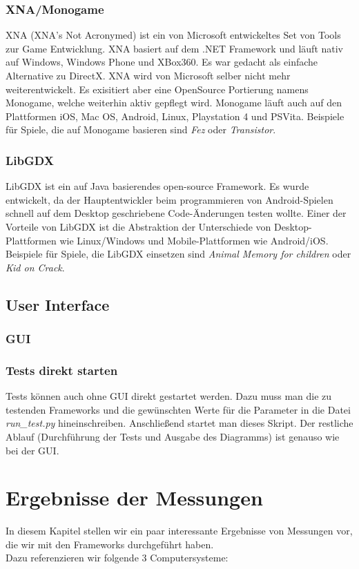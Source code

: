 \subsection{XNA/Monogame}
XNA (XNA's Not Acronymed) ist ein von Microsoft entwickeltes Set von Tools zur Game Entwicklung. XNA basiert auf dem .NET Framework und läuft nativ auf Windows, Windows Phone und XBox360. Es war gedacht als einfache Alternative zu DirectX. XNA wird von Microsoft selber nicht mehr weiterentwickelt. Es exisitiert aber eine OpenSource Portierung namens Monogame, welche weiterhin aktiv gepflegt wird. Monogame läuft auch auf den Plattformen iOS, Mac OS, Android, Linux, Playstation 4 und PSVita. Beispiele für Spiele, die auf Monogame basieren sind \emph{Fez} oder \emph{Transistor}.

\subsection{LibGDX}
LibGDX ist ein auf Java basierendes open-source Framework. Es wurde entwickelt, da der Hauptentwickler beim programmieren von Android-Spielen schnell auf dem Desktop geschriebene Code-Änderungen testen wollte. Einer der Vorteile von LibGDX ist die Abstraktion der Unterschiede von Desktop-Plattformen wie Linux/Windows und Mobile-Plattformen wie Android/iOS. Beispiele für Spiele, die LibGDX einsetzen sind \emph{Animal Memory for children} oder \emph{Kid on Crack}.

\section{User Interface}
\subsection{GUI}
\subsection{Tests direkt starten}
Tests können auch ohne GUI direkt gestartet werden. Dazu muss man die zu testenden Frameworks und die gewünschten Werte für die Parameter in die Datei \textit{run\_test.py} hineinschreiben. Anschließend startet man dieses Skript. Der restliche Ablauf (Durchführung der Tests und Ausgabe des Diagramms) ist genauso wie bei der GUI.

\chapter{Ergebnisse der Messungen}
In diesem Kapitel stellen wir ein paar interessante Ergebnisse von Messungen vor, die wir mit den Frameworks durchgeführt haben.\\
Dazu referenzieren wir folgende 3 Computersysteme:

